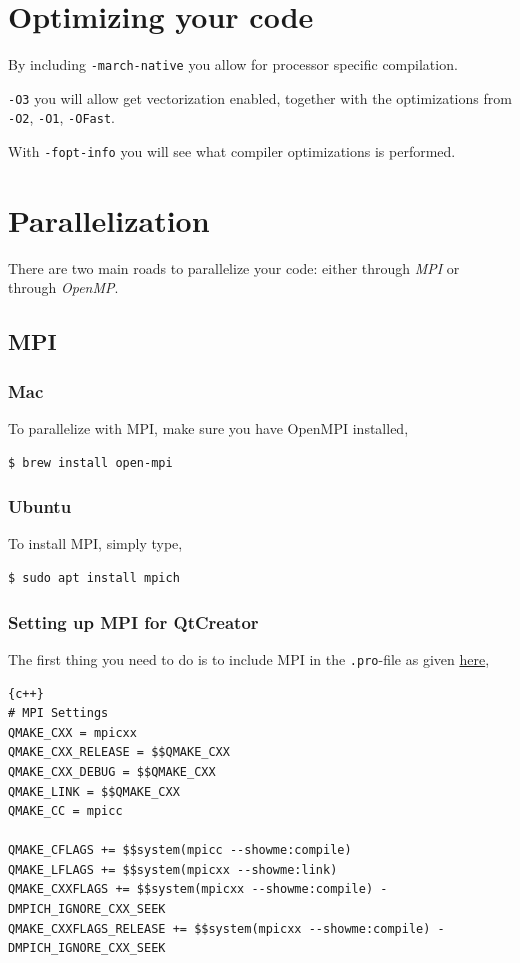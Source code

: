 \documentclass[11pt]{article}
\begin{document}
\section{Optimizing your code}
By including \texttt{-march-native} you allow for processor specific compilation.

\texttt{-O3} you will allow get vectorization enabled, together with the optimizations from \texttt{-O2}, \texttt{-O1}, \texttt{-OFast}. 

With \texttt{-fopt-info} you will see what compiler optimizations is performed.


\section{Parallelization}
There are two main roads to parallelize your code: either through \textit{MPI} or through \textit{OpenMP}. 
\subsection{MPI}

\subsubsection{Mac}
To parallelize with MPI, make sure you have OpenMPI installed,
\begin{lstlisting}
$ brew install open-mpi
\end{lstlisting}

\subsubsection{Ubuntu}
To install MPI, simply type,
\begin{lstlisting}
$ sudo apt install mpich
\end{lstlisting}

\subsubsection{Setting up MPI for QtCreator}
The first thing you need to do is to include MPI in the \texttt{.pro}-file as given \href{https://dragly.org/2012/03/14/developing-mpi-applications-in-qt-creator/}{here},
\begin{lstlisting}{c++}
# MPI Settings
QMAKE_CXX = mpicxx
QMAKE_CXX_RELEASE = $$QMAKE_CXX
QMAKE_CXX_DEBUG = $$QMAKE_CXX
QMAKE_LINK = $$QMAKE_CXX
QMAKE_CC = mpicc

QMAKE_CFLAGS += $$system(mpicc --showme:compile)
QMAKE_LFLAGS += $$system(mpicxx --showme:link)
QMAKE_CXXFLAGS += $$system(mpicxx --showme:compile) -DMPICH_IGNORE_CXX_SEEK
QMAKE_CXXFLAGS_RELEASE += $$system(mpicxx --showme:compile) -DMPICH_IGNORE_CXX_SEEK
\end{lstlisting}
\end{document}
